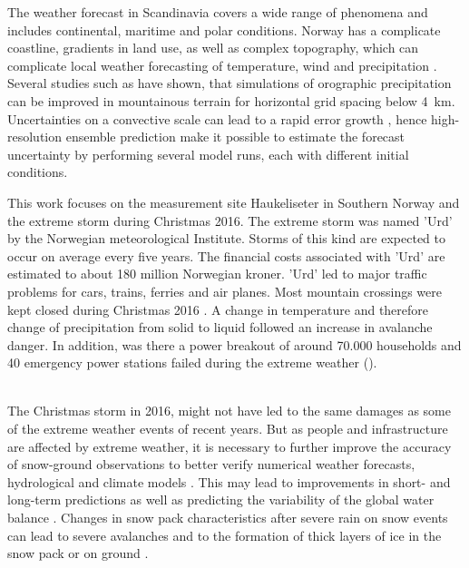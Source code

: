 The weather forecast in Scandinavia covers a wide range of phenomena and includes continental, maritime and polar conditions. Norway has a complicate coastline, gradients in land use, as well as complex topography, which can complicate local weather forecasting of temperature, wind and precipitation \citep{muller_arome-metcoop:_2017}. Several studies such as \citet{colle_1314_2005,garvert_1314_2005,schwartz_reproducing_2014} have shown, that simulations of orographic precipitation can be improved in mountainous terrain for horizontal grid spacing below \SI{4}{\km}. Uncertainties on a convective scale can lead to a rapid error growth \citep{lorenz_atmospheric_1969}, hence high-resolution ensemble prediction make it possible to estimate the forecast uncertainty by performing several model runs, each with different initial conditions. %
\par\medskip
\noindent
This work focuses on the measurement site Haukeliseter in Southern Norway and the extreme storm during Christmas 2016. The extreme storm was named 'Urd' by the Norwegian meteorological Institute. Storms of this kind are expected to occur on average every five years. The financial costs associated with 'Urd' are estimated to about 180 million Norwegian kroner. 'Urd' led to major traffic problems for cars, trains, ferries and air planes. Most mountain crossings were kept closed during Christmas 2016 \citep{olsen_ekstremvaerrapport._2017}. A change in temperature and therefore change of precipitation from solid to liquid followed an increase in avalanche danger. In addition, was there a power breakout of around 70.000 households and 40 emergency power stations failed during the extreme weather ().

\\
The Christmas storm in 2016, might not have led to the same damages as some of the extreme weather events of recent years. But as people and infrastructure are affected by extreme weather, it is necessary to further improve the accuracy of snow-ground observations to better verify numerical weather forecasts, hydrological and climate models \citep{joos_influence_2012}. This may lead to improvements in short- and long-term predictions as well as predicting the variability of the global water balance \citep{field_changes_2012}. Changes in snow pack characteristics after severe rain on snow events can lead to severe avalanches \citep{stimberis_glide_2011} and to the formation of thick layers of ice in the snow pack or on ground \citep{putkonen_rain--snow_2003,hansen_climate_2011}. 
